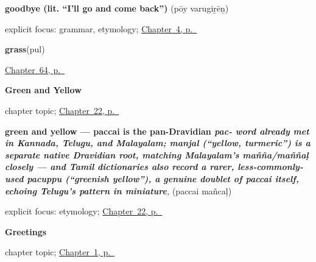 \noindent\begin{minipage}[t]{\linewidth}
\raggedright
\textbf{goodbye (lit. \textquotedblleft{}I'll go and come back\textquotedblright{})}\enspace\emph{ }\enspace(pōy varugiṟēṉ)\par
\footnotesize explicit focus: grammar, etymology; \hyperref[ch:farewells]{Chapter~4, p.~\pageref*{ch:farewells}}
\end{minipage}\par\smallskip

\noindent\begin{minipage}[t]{\linewidth}
\raggedright
\textbf{grass}\enspace\emph{}\enspace(pul)\par
\footnotesize \hyperref[ch:ta-the-harvest]{Chapter~64, p.~\pageref*{ch:ta-the-harvest}}
\end{minipage}\par\smallskip

\noindent\begin{minipage}[t]{\linewidth}
\raggedright
\textbf{Green and Yellow}\par
\footnotesize chapter topic; \hyperref[ch:ta-green-and-yellow]{Chapter~22, p.~\pageref*{ch:ta-green-and-yellow}}
\end{minipage}\par\smallskip

\noindent\begin{minipage}[t]{\linewidth}
\raggedright
\textbf{green and yellow — paccai is the pan-Dravidian \emph{pac- word already met in Kannada, Telugu, and Malayalam; manjal (\textquotedblleft{}yellow, turmeric\textquotedblright{}) is a separate native Dravidian root, matching Malayalam's mañña/maññaḷ closely — and Tamil dictionaries also record a rarer, less-commonly-used pacuppu (\textquotedblleft{}greenish yellow\textquotedblright{}), a genuine doublet of paccai itself, echoing Telugu's pattern in miniature}}\enspace\emph{, }\enspace(paccai mañcaḷ)\par
\footnotesize explicit focus: etymology; \hyperref[ch:ta-green-and-yellow]{Chapter~22, p.~\pageref*{ch:ta-green-and-yellow}}
\end{minipage}\par\smallskip

\noindent\begin{minipage}[t]{\linewidth}
\raggedright
\textbf{Greetings}\par
\footnotesize chapter topic; \hyperref[ch:greetings]{Chapter~1, p.~\pageref*{ch:greetings}}
\end{minipage}\par\smallskip

